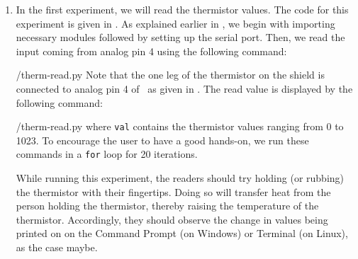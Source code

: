 \begin{enumerate}
  \item In the first experiment, we will read the thermistor values.
        The code for this experiment is given in .
        As explained earlier in , we begin with
        importing necessary modules followed by setting up the serial port.
        Then, we read the input coming from analog pin 4 using the
        following command:
        
        {\LocTHERMpycode/therm-read.py} Note that the one leg of the thermistor on
        the shield is connected to analog pin 4 of \arduino\,
        as given in . The read value is displayed
        by the following command:
        
        {\LocTHERMpycode/therm-read.py} where {\tt val} contains
        the thermistor values ranging from 0 to 1023. To
        encourage the user to have a good hands-on, we run these commands in
        a {\tt for} loop for 20 iterations.

        While running this experiment,
        the readers should try holding (or rubbing) the thermistor with their fingertips.
        Doing so will transfer heat from the person holding the
        thermistor, thereby raising the temperature of the thermistor.
        Accordingly, they should observe the change in values being printed on on the
        Command Prompt (on Windows) or Terminal (on Linux), as the case maybe.



\end{enumerate}
